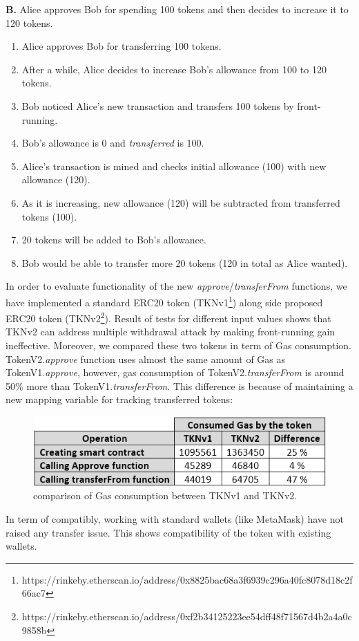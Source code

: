 \noindent \textbf{B.} Alice approves Bob for spending 100 tokens and then decides to increase it to 120 tokens.
\begin{enumerate}
	\item Alice approves Bob for transferring 100 tokens.
	\item After a while, Alice decides to increase Bob’s allowance from 100 to 120 tokens.
	\item Bob noticed Alice’s new transaction and transfers 100 tokens by front-running.
	\item Bob’s allowance is 0 and \textit{transferred} is 100.
	\item Alice’s transaction is mined and checks initial allowance (100) with new allowance (120).
	\item As it is increasing, new allowance (120) will be subtracted from transferred tokens (100).
	\item 20 tokens will be added to Bob’s allowance.
	\item Bob would be able to transfer more 20 tokens (120 in total as Alice wanted).
\end{enumerate}
In order to evaluate functionality of the new \textit{approve}/\textit{transferFrom} functions, we have implemented a standard ERC20 token (TKNv1\footnote{https://rinkeby.etherscan.io/address/0x8825bac68a3f6939c296a40fc8078d18c2f66ac7}) along side proposed ERC20 token (TKNv2\footnote{https://rinkeby.etherscan.io/address/0xf2b34125223ee54dff48f71567d4b2a4a0c9858b}). Result of tests for different input values shows that TKNv2 can address multiple withdrawal attack by making front-running gain ineffective. Moreover, we compared these two tokens in term of Gas consumption. TokenV2.\textit{approve} function uses almost the same amount of Gas as TokenV1.\textit{approve}, however, gas consumption of TokenV2.\textit{transferFrom} is around 50\% more than TokenV1.\textit{transferFrom}. This difference is because of maintaining a new mapping variable for tracking transferred tokens:
\begin{figure}[H]
	\centering
	\includegraphics[width=1.0\linewidth]{figures/multiple_withdrawal_22.png}
	\caption{comparison of Gas consumption between TKNv1 and TKNv2.}
\end{figure}
\noindent In term of compatibly, working with standard wallets (like MetaMask) have not raised any transfer issue. This shows compatibility of the token with existing wallets.

